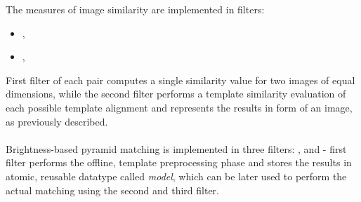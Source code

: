 \begin{refImpl}
The measures of image similarity are implemented in \studio filters:
\begin{itemize}
	\item {}, 
	\item {}, 
\end{itemize}
First filter of each pair computes a single similarity value for two images of equal dimensions, while the second filter performs a template similarity evaluation of each possible template alignment and represents the results in form of an image, as previously described.

\paragraph*{}
Brightness-based pyramid matching is implemented in three \studio filters: ,  and  - first filter performs the offline, template preprocessing phase and stores the results in atomic, reusable datatype called \textit{model}, which can be later used to perform the actual matching using the second and third filter.
\end{refImpl}